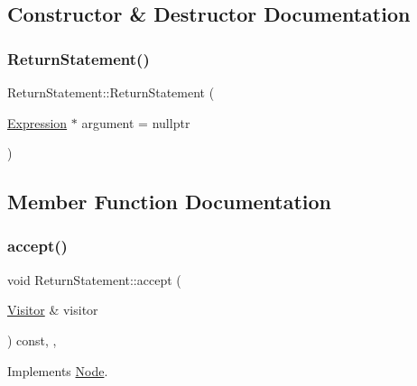 \subsection{Constructor \& Destructor Documentation}
\mbox{\label{struct_return_statement_ac2932e3a360cb4399de2f6235e64081a}} 
\subsubsection{\texorpdfstring{Return\+Statement()}{ReturnStatement()}}
{\footnotesize\ttfamily Return\+Statement\+::\+Return\+Statement (\begin{DoxyParamCaption}\item[{\hyperlink{struct_expression}{Expression} $\ast$}]{argument = {\ttfamily nullptr} }\end{DoxyParamCaption})\hspace{0.3cm}{\ttfamily [inline]}}



\subsection{Member Function Documentation}
\mbox{\label{struct_return_statement_af266bfb192300eeffc2d7454b019dd1a}} 
\subsubsection{\texorpdfstring{accept()}{accept()}}
{\footnotesize\ttfamily void Return\+Statement\+::accept (\begin{DoxyParamCaption}\item[{\hyperlink{struct_visitor}{Visitor} \&}]{visitor }\end{DoxyParamCaption}) const\hspace{0.3cm}{\ttfamily [inline]}, {\ttfamily [override]}, {\ttfamily [virtual]}}



Implements \hyperlink{struct_node_a10bd7af968140bbf5fa461298a969c71}{Node}.

\mbox{\label{struct_return_statement_a4eff2224709e229d34fa4643f708a3a7}} 
